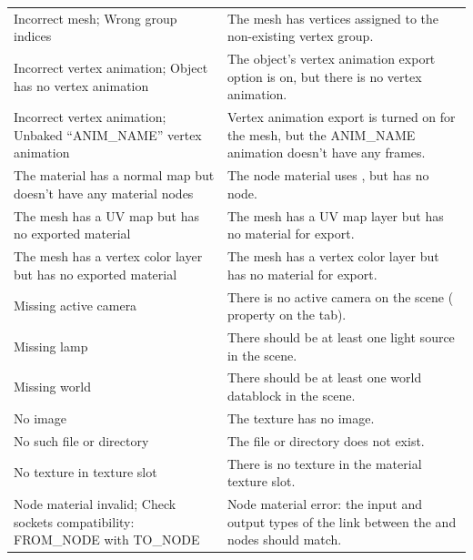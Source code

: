 \documentclass[a4paper,12pt,oneside]{sphinxmanual}
\begin{document}
\begin{tabulary}{\linewidth}{|L|L|}
\hline

Incorrect mesh; Wrong group indices
 & 
The mesh has vertices assigned to the non-existing vertex group.
\\

Incorrect vertex animation; Object
has no vertex animation
 & 
The object's vertex animation export option is on, but there is no vertex animation.
\\

Incorrect vertex animation; Unbaked
``ANIM\_NAME'' vertex animation
 & 
Vertex animation export is turned on for the mesh, but the ANIM\_NAME animation doesn't have any frames.
\\

The material has a normal map but
doesn't have any material nodes
 & 
The node material uses , but has no  node.
\\

The mesh has a UV map but has no
exported material
 & 
The mesh has a UV map layer but has no material for export.
\\

The mesh has a vertex color layer
but has no exported material
 & 
The mesh has a vertex color layer but has no material for export.
\\

Missing active camera
 & 
There is no active camera on the scene ( property on the  tab).
\\

Missing lamp
 & 
There should be at least one light source in the scene.
\\

Missing world
 & 
There should be at least one world datablock in the scene.
\\

No image
 & 
The texture has no image.
\\

No such file or directory
 & 
The file or directory does not exist.
\\

No texture in texture slot
 & 
There is no texture in the material texture slot.
\\

Node material invalid; Check
sockets compatibility: FROM\_NODE
with TO\_NODE
 & 
Node material error: the input and output types of the link between the  and  nodes should match.
\\


\end{tabulary}
\end{document}
